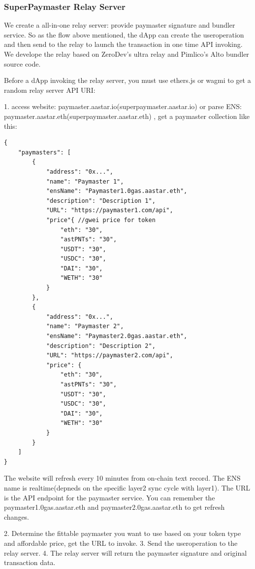 \documentclass[preprint,12pt]{elsarticle}
\begin{document}
\subsubsection{SuperPaymaster Relay Server}

We create a all-in-one relay server: provide paymaster signature and bundler service. So as the flow above mentioned, the dApp can create the useroperation and then send to the relay to launch the transaction in one time API invoking. We develope the relay based on ZeroDev's ultra relay \cite{zerodev-bundler} and Pimlico's Alto bundler \cite{pimlico-alto} source code.

Before a dApp invoking the relay server, you must use ethers.js or wagmi to get a random relay server API URI:

1. access website: paymaster.aastar.io(superpaymaster.aastar.io) or parse ENS: paymaster.aastar.eth(superpaymaster.aastar.eth) , get a paymaster collection like this:

\begin{verbatim}
{
    "paymasters": [
        {
            "address": "0x...",
            "name": "Paymaster 1",
            "ensName": "Paymaster1.0gas.aastar.eth",
            "description": "Description 1",
            "URL": "https://paymaster1.com/api",
            "price"{ //gwei price for token
                "eth": "30",
                "astPNTs": "30",
                "USDT": "30",
                "USDC": "30",
                "DAI": "30",
                "WETH": "30"
            }
        },
        {
            "address": "0x...",
            "name": "Paymaster 2",
            "ensName": "Paymaster2.0gas.aastar.eth",
            "description": "Description 2",
            "URL": "https://paymaster2.com/api",
            "price": {
                "eth": "30",
                "astPNTs": "30",
                "USDT": "30",
                "USDC": "30",
                "DAI": "30",
                "WETH": "30"
            }
        }
    ]
}
\end{verbatim}

The website will refresh every 10 minutes from on-chain text record. The ENS name is realtime(depneds on the specific layer2 sync cycle with layer1). The URL is the API endpoint for the paymaster service. You can remember the paymaster1.0gas.aastar.eth and paymaster2.0gas.aastar.eth to get refresh changes. 

2. Determine the fittable paymaster you want to use based on your token type and affordable price, get the URL to invoke. 
3. Send the useroperation to the relay server. 
4. The relay server will return the paymaster signature and original transaction data.
\end{document}

